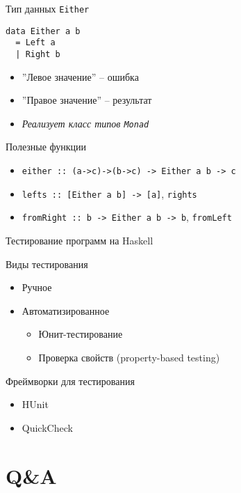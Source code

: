 \documentclass{beamer}
\newcommand{\hs}[1]{\texttt{#1}}
\begin{document}
\begin{frame}[fragile]{Тип данных \texttt{Either}}
\begin{verbatim}
data Either a b
  = Left a
  | Right b
\end{verbatim}
    \begin{itemize}
        \item ''Левое значение'' -- ошибка
        \item ''Правое значение'' -- результат
        \item \textit{Реализует класс типов \texttt{Monad}}
    \end{itemize}
    \begin{block}{Полезные функции}
        \begin{itemize}
            \item \hs{either :: (a->c)->(b->c) -> Either a b -> c}
            \item \hs{lefts :: [Either a b] -> [a]}, \hs{rights}
            \item \hs{fromRight :: b -> Either a b -> b}, \hs{fromLeft}
        \end{itemize}
    \end{block}
\end{frame}
\begin{frame}{Тестирование программ на Haskell}
    \begin{block}{Виды тестирования}
        \begin{itemize}
            \item \pause Ручное
            \item \pause Автоматизированное
            \begin{itemize}
                \item \pause Юнит-тестирование
                \item \pause Проверка свойств (property-based testing)
            \end{itemize}
        \end{itemize}
    \end{block}
    \pause
    \begin{block}{Фреймворки для тестирования}
        \begin{itemize}
            \item HUnit
            \item QuickCheck
        \end{itemize}
    \end{block}
\end{frame}
\section{Q\&A}
\end{document}
